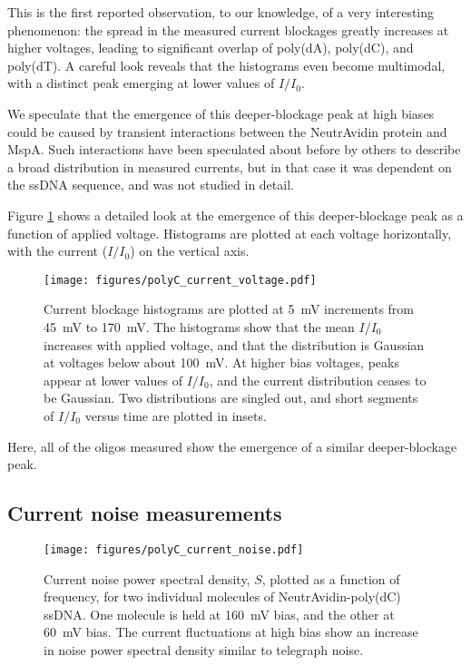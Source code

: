 This is the first reported observation, to our knowledge, of a very interesting phenomenon: the spread in the measured current blockages greatly increases at higher voltages, leading to significant overlap of poly(dA), poly(dC), and poly(dT).  A careful look reveals that the histograms even become multimodal, with a distinct peak emerging at lower values of $I/I_0$.

We speculate that the emergence of this deeper-blockage peak at high biases could be caused by transient interactions between the NeutrAvidin protein and MspA.  Such interactions have been speculated about before by others \citep{Manrao2011} to describe a broad distribution in measured currents, but in that case it was dependent on the ssDNA sequence, and was not studied in detail.

Figure \ref{fig:polyC_hists} shows a detailed look at the emergence of this deeper-blockage peak as a function of applied voltage.  Histograms are plotted at each voltage horizontally, with the current ($I/I_0$) on the vertical axis.

\begin{figure}[h]
\begin{centering}
\texttt{[image: figures/polyC\_current\_voltage.pdf]}
\caption[Current histograms for poly(dC) ssDNA versus voltage]{Current blockage histograms are plotted at \SI{5}{\mV} increments from \SI{45}{\mV} to \SI{170}{\mV}.  The histograms show that the mean $I/I_0$ increases with applied voltage, and that the distribution is Gaussian at voltages below about \SI{100}{\mV}.  At higher bias voltages, peaks appear at lower values of $I/I_0$, and the current distribution ceases to be Gaussian.  Two distributions are singled out, and short segments of $I/I_0$ versus time are plotted in insets.}
\label{fig:polyC_hists}
\end{centering}
\end{figure}

Here, all of the oligos measured show the emergence of a similar deeper-blockage peak.

\subsection{Current noise measurements}

\begin{figure}[h]
\begin{centering}
\texttt{[image: figures/polyC\_current\_noise.pdf]}
\caption[Current fluctuations for single molecule poly(dC) ssDNA]{Current noise power spectral density, $S$, plotted as a function of frequency, for two individual molecules of NeutrAvidin-poly(dC) ssDNA.  One molecule is held at \SI{160}{\mV} bias, and the other at \SI{60}{\mV} bias.  The current fluctuations at high bias show an increase in noise power spectral density similar to telegraph noise.}
\label{fig:polyC_fluctuations}
\end{centering}
\end{figure}

